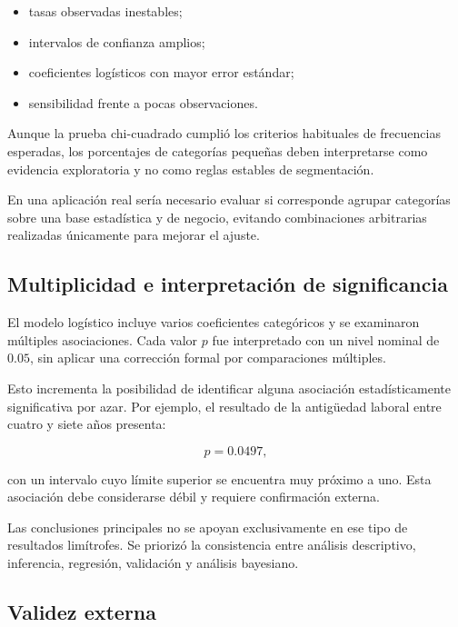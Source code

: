 \begin{itemize}
    \item tasas observadas inestables;

    \item intervalos de confianza amplios;

    \item coeficientes logísticos con mayor error estándar;

    \item sensibilidad frente a pocas observaciones.
\end{itemize}

Aunque la prueba chi-cuadrado cumplió los criterios habituales de
frecuencias esperadas, los porcentajes de categorías pequeñas deben
interpretarse como evidencia exploratoria y no como reglas estables de
segmentación.

En una aplicación real sería necesario evaluar si corresponde agrupar
categorías sobre una base estadística y de negocio, evitando combinaciones
arbitrarias realizadas únicamente para mejorar el ajuste.

\subsection{Multiplicidad e interpretación de significancia}

El modelo logístico incluye varios coeficientes categóricos y se
examinaron múltiples asociaciones. Cada valor \(p\) fue interpretado con
un nivel nominal de \(0.05\), sin aplicar una corrección formal por
comparaciones múltiples.

Esto incrementa la posibilidad de identificar alguna asociación
estadísticamente significativa por azar. Por ejemplo, el resultado de la
antigüedad laboral entre cuatro y siete años presenta:

\[
p=0.0497,
\]

con un intervalo cuyo límite superior se encuentra muy próximo a uno.
Esta asociación debe considerarse débil y requiere confirmación externa.

Las conclusiones principales no se apoyan exclusivamente en ese tipo de
resultados limítrofes. Se priorizó la consistencia entre análisis
descriptivo, inferencia, regresión, validación y análisis bayesiano.

\subsection{Validez externa}

